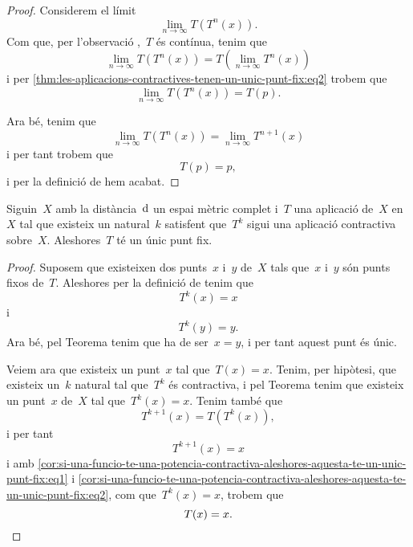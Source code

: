 \documentclass[../equacions-diferencials-I.tex]{subfiles}
\begin{document}
\begin{proof}
        Considerem el límit
        \[
            \lim_{n\to\infty}T(T^{n}(x)).
        \]
        Com que, per l'observació ,~\(T\) és contínua, tenim que %
        \[
            \lim_{n\to\infty}T(T^{n}(x))=T\left(\lim_{n\to\infty}T^{n}(x)\right)
        \]
        i per \eqref{thm:les-aplicacions-contractives-tenen-un-unic-punt-fix:eq2} trobem que
        \[
            \lim_{n\to\infty}T(T^{n}(x))=T(p).
        \]

        Ara bé, tenim que
        \[
            \lim_{n\to\infty}T(T^{n}(x))=\lim_{n\to\infty}T^{n+1}(x)
        \]
        i per tant trobem que
        \[
            T(p)=p,
        \]
        i per la definició de  hem acabat.
    \end{proof}
    \begin{corollary}
        \label{cor:si-una-funcio-te-una-potencia-contractiva-aleshores-aquesta-te-un-unic-punt-fix}
        Siguin~\(X\) amb la distància~\(\operatorname{d}\) un espai mètric complet i~\(T\) una aplicació de~\(X\) en~\(X\) tal que existeix un natural~\(k\) satisfent que~\(T^{k}\) sigui una aplicació contractiva sobre~\(X\).
        Aleshores~\(T\) té un únic punt fix.
    \end{corollary}
    \begin{proof}
        Suposem que existeixen dos punts~\(x\) i~\(y\) de~\(X\) tals que~\(x\) i~\(y\) són punts fixos de~\(T\).
        Aleshores per la definició de  tenim que
        \[
            T^{k}(x)=x
        \]
        i
        \[
            T^{k}(y)=y.
        \]
        Ara bé, pel Teorema  tenim que ha de ser~\(x=y\), i per tant aquest punt és únic.

        Veiem ara que existeix un punt~\(x\) tal que~\(T(x)=x\).
        Tenim, per hipòtesi, que existeix un~\(k\) natural tal que~\(T^{k}\) és contractiva, i pel Teorema  tenim que existeix un punt~\(x\) de~\(X\) tal que~\(T^{k}(x)=x\).
        Tenim també que
        \begin{equation}
            \label{cor:si-una-funcio-te-una-potencia-contractiva-aleshores-aquesta-te-un-unic-punt-fix:eq1}
            T^{k+1}(x)=T(T^{k}(x)),
        \end{equation}
        i per tant
        \begin{equation}
            \label{cor:si-una-funcio-te-una-potencia-contractiva-aleshores-aquesta-te-un-unic-punt-fix:eq2}
            T^{k+1}(x)=x
        \end{equation}
        i amb \eqref{cor:si-una-funcio-te-una-potencia-contractiva-aleshores-aquesta-te-un-unic-punt-fix:eq1} i \eqref{cor:si-una-funcio-te-una-potencia-contractiva-aleshores-aquesta-te-un-unic-punt-fix:eq2}, com que~\(T^{k}(x)=x\), trobem que
        \[
            T(x)=x.\qedhere
        \]
    \end{proof}
\end{document}
